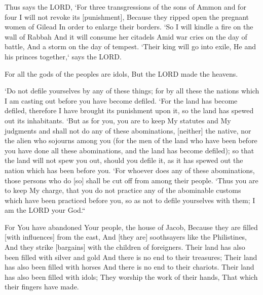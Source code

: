 \begin{scripture}[Amos 1:13-15]
    Thus says the LORD, `For three transgressions of the sons of Ammon and for four I will not revoke its [punishment], Because they ripped open the pregnant women of Gilead In order to enlarge their borders.
    `So I will kindle a fire on the wall of Rabbah And it will consume her citadels Amid war cries on the day of battle, And a storm on the day of tempest.
    `Their king will go into exile, He and his princes together,` says the LORD.
\end{scripture}

\begin{scripture}[Psalm 96:5]
    For all the gods of the peoples are idols, But the LORD made the heavens.
\end{scripture}

\begin{scripture}[Leviticus 18:24-30]
    `Do not defile yourselves by any of these things; for by all these the nations which I am casting out before you have become defiled.
    `For the land has become defiled, therefore I have brought its punishment upon it, so the land has spewed out its inhabitants.
    `But as for you, you are to keep My statutes and My judgments and shall not do any of these abominations, [neither] the native, nor the alien who sojourns among you
    (for the men of the land who have been before you have done all these abominations, and the land has become defiled);
    so that the land will not spew you out, should you defile it, as it has spewed out the nation which has been before you.
    `For whoever does any of these abominations, those persons who do [so] shall be cut off from among their people.
    `Thus you are to keep My charge, that you do not practice any of the abominable customs which have been practiced before you, so as not to defile yourselves with them; I am the LORD your God.``
\end{scripture}

\begin{scripture}[Isaiah 2:6-8]
    For You have abandoned Your people, the house of Jacob, Because they are filled [with influences] from the east, And [they are] soothsayers like the Philistines, And they strike [bargains] with the children of foreigners.
    Their land has also been filled with silver and gold And there is no end to their treasures; Their land has also been filled with horses And there is no end to their chariots.
    Their land has also been filled with idols; They worship the work of their hands, That which their fingers have made.
\end{scripture}

